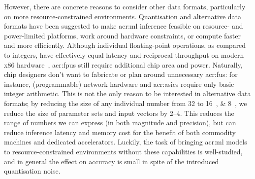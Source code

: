 However, there are concrete reasons to consider other data formats, particularly on more resource-constrained environments.
Quantisation and alternative data formats have been suggested to make \gls{acr:ml} inference feasible on resource- and power-limited platforms, work around hardware constraints, or compute faster and more efficiently.
Although individual floating-point operations, as compared to integers, have effectively equal latency and reciprocal throughput on modern x86 hardware~\parencite{agner-x86}, \glspl{acr:fpu} still require additional chip area and power.
Naturally, chip designers don't want to fabricate or plan around unnecessary \glspl{acr:fu}: for instance, (programmable) network hardware and \glspl{acr:asic} require only basic integer arithmetic.
This is not the only reason to be interested in alternative data formats; by reducing the size of any individual number from \qty{32}{\bit} to \qtylist[list-pair-separator = { or }]{16; 8}{\bit}, we reduce the size of parameter sets and input vectors by \qtyrange{2}{4}{\times}.
This reduces the range of numbers we can express (in both magnitude and precision), but can reduce inference latency and memory cost for the benefit of both commodity machines and dedicated accelerators.
Luckily, the task of bringing \gls{acr:ml} models to resource-constrained environments without these capabilities is well-studied, and in general the effect on accuracy is small in spite of the introduced quantisation noise.

